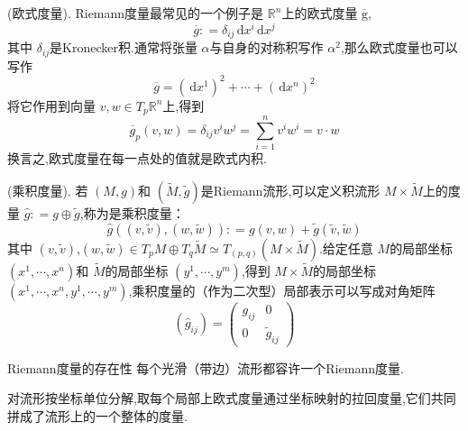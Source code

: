 \documentclass[../../几何与拓扑.tex]{subfiles}
\begin{document}
\begin{example}{(欧式度量)}.
        Riemann度量最常见的一个例子是 $ \mathbb{R} ^{n} $上的欧式度量 $ \overline{\mathrm{g}} $, $$
        \overline{g}: = \delta_{ij} \,\mathrm{d} x^{i} \,\mathrm{d} x^{j}
        $$其中 $ \delta_{ij} $是Kronecker积.通常将张量 $ \alpha $与自身的对称积写作 $ \alpha^{2} $,那么欧式度量也可以写作 $$
        \overline{g} = \left( \,\mathrm{d} x^{1} \right)^{2}+ \cdots + \left( \,\mathrm{d} x^{n} \right)^{2}  
        $$  将它作用到向量 $ v,w \in T_{p}\mathbb{R} ^{n} $上,得到 $$
        \overline{g}_{p}\left( v,w \right)= \delta_{ij}v^{i}w^{j}= \sum_{i=1 }^{n } v^{i}w^{i}= v\cdot w 
        $$ 换言之,欧式度量在每一点处的值就是欧式内积.
\end{example}
\begin{example}{(乘积度量)}.
    若 $ \left( M,g \right)  $和 $ \left( \tilde{M}, \tilde{g} \right)  $是Riemann流形,可以定义积流形 $ M\times  \tilde{M} $上的度量 $ \hat{g}: =  g\oplus \tilde{g} $,称为是乘积度量：  $$
    \hat{g}\left( \left( v,\tilde{v} \right),\left( w,\tilde{w} \right)   \right) : = g\left( v,w \right)+  \tilde{g}\left( \tilde{v},\tilde{w} \right)   
    $$    其中 $ \left( v, \tilde{v} \right)  $,$ \left( w,\tilde{w} \right)   \in  T_{p} M \oplus  T_{q} \tilde{M}\simeq  T_{\left( p,q \right) } \left( M\times  \tilde{M} \right) $.给定任意 $ M $的局部坐标 $ \left( x^{1},\cdots ,x^{n} \right)  $和 $ \tilde{M} $的局部坐标 $ \left( y^{1},\cdots ,y^{m} \right)  $,得到
    $ M\times \tilde{M} $的局部坐标 $ \left( x^{1},\cdots ,x^{n},y^{1},\cdots ,y^{m} \right)  $,乘积度量的（作为二次型）局部表示可以写成对角矩阵 $$
    \left( \hat{g}_{ij} \right)=\begin{pmatrix} 
        g_{ij}  & 0\\ 
         0& \tilde{g}_{ij} 
    \end{pmatrix}  
    $$      
    
\end{example}

\begin{proposition}{Riemann度量的存在性}
    每个光滑（带边）流形都容许一个Riemann度量.
\end{proposition}

\begin{note}
    对流形按坐标单位分解,取每个局部上欧式度量通过坐标映射的拉回度量,它们共同拼成了流形上的一个整体的度量.
\end{note}
\end{document}
